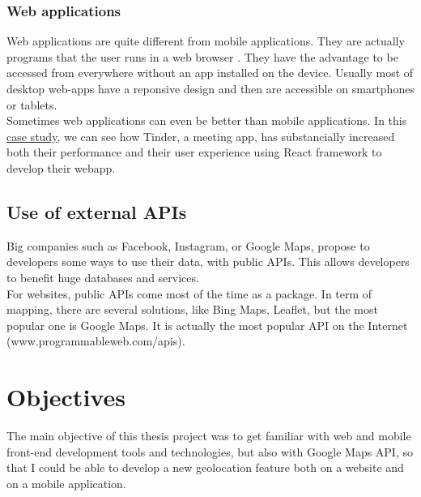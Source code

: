 \documentclass{article}
\begin{document}
                    \subsubsection{Web applications}
                        Web applications are quite different from mobile applications. They are actually programs that the user runs
                        in a web browser \cite{webapp}. They have the advantage to be accessed from everywhere without an app installed
                        on the device. Usually most of desktop web-apps have a reponsive design and then are accessible on smartphones
                        or tablets.\\
                        Sometimes web applications can even be better than mobile applications. In this \href{https://medium.com/@addyosmani/a-tinder-progressive-web-app-performance-case-study-78919d98ece0}{case study},
                        we can see how Tinder, a meeting app, has substancially increased both their performance and their user experience
                        using React framework to develop their webapp.

                \subsection{Use of external APIs}
                    Big companies such as Facebook, Instagram, or Google Maps, propose to developers some ways to use their data, with public
                    APIs. This allows developers to benefit huge databases and services.\\
                    For websites, public APIs come most of the time as a package.
                    In term of mapping, there are several solutions, like Bing Maps, Leaflet, but the most popular one is Google Maps. It is actually the most
                    popular API on the Internet (www.programmableweb.com/apis).


        \newpage
        \section{Objectives}
            \vspace{1cm}
            The main objective of this thesis project was to get familiar with web and mobile front-end
            development tools and technologies, but also with Google Maps API, so that I could be able to develop a new geolocation feature both on a 
            website and on a mobile application. \newline
\end{document}
